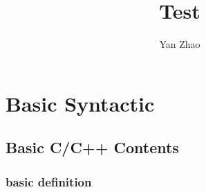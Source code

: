 \documentclass[a4paper,11pt,twoside]{book}
\begin{document}
\title{Test}
\author{Yan Zhao}
\date{}\maketitle

\setcounter{secnumdepth}{4}
\setcounter{tocdepth}{4}
\tableofcontents


\chapter{Basic Syntactic}

\section{Basic C/C++ Contents}
\subsection{basic definition}
\end{document}
